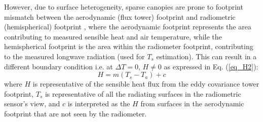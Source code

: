 \documentclass[fleqn,10pt]{wlscirep}
\begin{document}
However, due to surface heterogeneity, sparse canopies are prone to footprint mismatch between the aerodynamic (flux tower) footprint and radiometric (hemispherical) footprint \cite{chu2021representativeness,marcolla2018geometry,morillas2013using}, where the aerodynamic footprint represents the area contributing to measured sensible heat and air temperature, while the hemispherical footprint is the area within the radiometer footprint, contributing to the measured longwave radiation (used for $T_{s}$ estimation). This can result in a different boundary condition i.e. at $\Delta T =0$, $H \not= 0$ as expressed in Eq. (\ref{eq_H2}): %
\begin{equation}\label{eq_H2}
H= m(T_{s} - T_{a}) +  c    %
\end{equation}
where $H$ is representative of the sensible heat flux from the eddy covariance tower footprint, $T_{s}$ is representative of all the radiating surfaces in the radiometric sensor’s view, and $c$ is interpreted as the $H$ from surfaces in the aerodynamic footprint that are not seen by the radiometer. 

\end{document}
